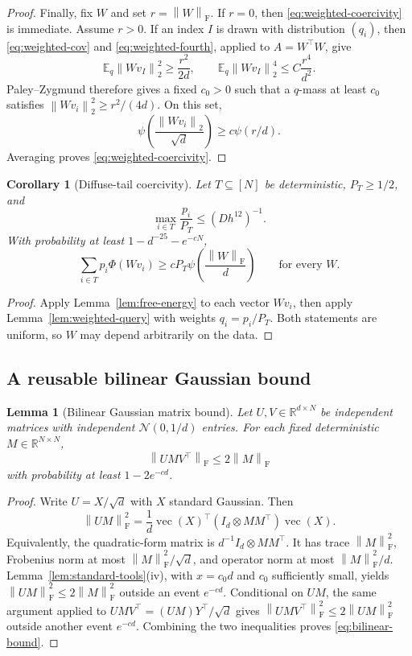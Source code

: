 \documentclass[11pt]{article}
\newtheorem{lemma}[theorem]{Lemma}
\newtheorem{corollary}[theorem]{Corollary}
\theoremstyle{remark}
\newcommand{\R}{\mathbb R}
\newcommand{\E}{\mathbb E}
\newcommand{\norm}[1]{\left\lVert #1\right\rVert}
\newcommand{\F}{\mathrm{F}}
\newcommand{\1}{\mathbf 1}
\newcommand{\vecop}{\operatorname{vec}}
\begin{document}
\begin{proof}
Finally, fix $W$ and set $r=\norm W_{\F}$.  If $r=0$, then
\eqref{eq:weighted-coercivity} is immediate.  Assume $r>0$.  If an
index $I$ is drawn with distribution $(q_i)$, then \eqref{eq:weighted-cov} and
\eqref{eq:weighted-fourth}, applied to $A=W^\top W$, give
\[
 \E_q\norm{Wv_I}_2^2\geq\frac{r^2}{2d},
 \qquad
 \E_q\norm{Wv_I}_2^4\leq C\frac{r^4}{d^2}.
\]
Paley--Zygmund therefore gives a fixed $c_0>0$ such that a $q$-mass at
least $c_0$ satisfies
$\norm{Wv_i}_2^2\geq r^2/(4d)$.  On this set,
\[
 \psi\!\left(\frac{\norm{Wv_i}_2}{\sqrt d}\right)
 \geq c\psi(r/d).
\]
Averaging proves \eqref{eq:weighted-coercivity}.
\end{proof}

\begin{corollary}[Diffuse-tail coercivity]
\label{cor:tail-coercivity}
Let $T\subseteq[N]$ be deterministic, $P_T\geq1/2$, and
\[
 \max_{i\in T}\frac{p_i}{P_T}\leq(Dh^{12})^{-1}.
\]
With probability at least $1-d^{-25}-e^{-cN}$,
\begin{equation}
 \sum_{i\in T}p_i\Phi(Wv_i)
 \geq cP_T\psi\!\left(\frac{\norm W_{\F}}d\right)
 \qquad\text{for every }W.
 \label{eq:tail-coercivity}
\end{equation}
\end{corollary}

\begin{proof}
Apply Lemma~\ref{lem:free-energy} to each vector $Wv_i$, then apply
Lemma~\ref{lem:weighted-query} with weights $q_i=p_i/P_T$.  Both
statements are uniform, so $W$ may depend arbitrarily on the data.
\end{proof}

\subsection{A reusable bilinear Gaussian bound}

\begin{lemma}[Bilinear Gaussian matrix bound]
\label{lem:bilinear}
Let $U,V\in\R^{d\times N}$ be independent matrices with independent
$\mathcal N(0,1/d)$ entries.  For each fixed deterministic
$M\in\R^{N\times N}$,
\begin{equation}
 \norm{UMV^\top}_{\F}\leq2\norm M_{\F}
 \label{eq:bilinear-bound}
\end{equation}
with probability at least $1-2e^{-cd}$.
\end{lemma}

\begin{proof}
Write $U=X/\sqrt d$ with $X$ standard Gaussian.  Then
\[
 \norm{UM}_{\F}^2
 =\frac1d\vecop(X)^\top(I_d\otimes MM^\top)\vecop(X).
\]
Equivalently, the quadratic-form matrix is
$d^{-1}I_d\otimes MM^\top$.  It has trace $\norm M_{\F}^2$,
Frobenius norm at most $\norm M_{\F}^2/\sqrt d$, and operator norm at
most $\norm M_{\F}^2/d$.  Lemma~\ref{lem:standard-tools}(iv), with
$x=c_0d$ and $c_0$ sufficiently small, yields
$\norm{UM}_{\F}^2\leq2\norm M_{\F}^2$ outside an event $e^{-cd}$.
Conditional on $UM$, the same argument applied to
$UMV^\top=(UM)Y^\top/\sqrt d$ gives
$\norm{UMV^\top}_{\F}^2\leq2\norm{UM}_{\F}^2$ outside another event
$e^{-cd}$.  Combining the two inequalities proves
\eqref{eq:bilinear-bound}.
\end{proof}
\end{document}
